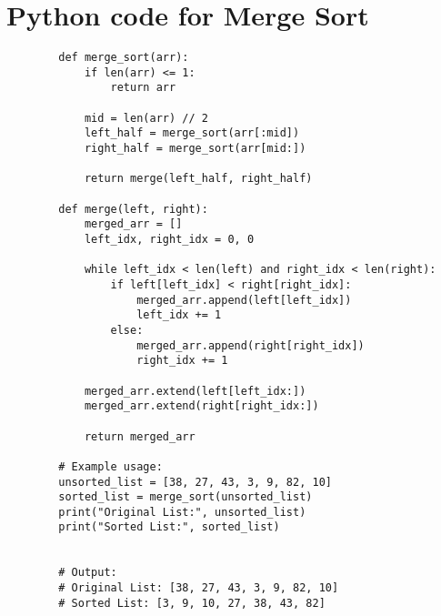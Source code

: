 \documentclass[a4paper, 12pt]{report}
\begin{document}
\begin{tikzpicture}[node distance = 2cm]
            
        \end{tikzpicture}
        


    \newpage
    
    \section{Python code for Merge Sort}
        \begin{verbatim}
        def merge_sort(arr):
            if len(arr) <= 1:
                return arr
        
            mid = len(arr) // 2
            left_half = merge_sort(arr[:mid])
            right_half = merge_sort(arr[mid:])
        
            return merge(left_half, right_half)
        
        def merge(left, right):
            merged_arr = []
            left_idx, right_idx = 0, 0
        
            while left_idx < len(left) and right_idx < len(right):
                if left[left_idx] < right[right_idx]:
                    merged_arr.append(left[left_idx])
                    left_idx += 1
                else:
                    merged_arr.append(right[right_idx])
                    right_idx += 1
        
            merged_arr.extend(left[left_idx:])
            merged_arr.extend(right[right_idx:])
        
            return merged_arr

        # Example usage:
        unsorted_list = [38, 27, 43, 3, 9, 82, 10]
        sorted_list = merge_sort(unsorted_list)
        print("Original List:", unsorted_list)
        print("Sorted List:", sorted_list)


        # Output:
        # Original List: [38, 27, 43, 3, 9, 82, 10]
        # Sorted List: [3, 9, 10, 27, 38, 43, 82]
        \end{verbatim}
    
\end{document}
